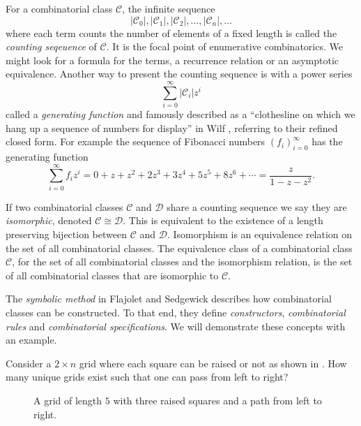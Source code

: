 For a combinatorial class $\mathcal{C}$, the infinite sequence 
\[
    |\mathcal{C}_0|, |\mathcal{C}_1|, |\mathcal{C}_2|,\dotsc,|\mathcal{C}_n|,\dotsc
\]
where each term counts the number of elements of a fixed length is called the \emph{counting seqeuence} of $\mathcal{C}$. It is the focal point of enumerative combinatorics. We might look for a formula for the terms, a recurrence relation or an asymptotic equivalence. Another way to present the counting sequence is with a power series
\[
    \sum_{i=0}^\infty |\mathcal{C}_i|z^i
\]
called a \emph{generating function} and famously described as a ``clothesline on which we hang up a sequence of numbers for display'' in Wilf \cite{wilf:gf}, referring to their refined closed form. For example the sequence of Fibonacci numbers $\left(f_i\right)_{i=0}^\infty$ has the generating function
\[
    \sum_{i=0}^\infty f_iz^i = 0 + z + z^2 + 2z^3 + 3z^4 + 5z^5 + 8z^6 + \dotsb = \frac{z}{1-z-z^2}.
\]

If two combinatorial classes $\mathcal{C}$ and $\mathcal{D}$ share a counting sequence we say they are \emph{isomorphic}, denoted $\mathcal{C} \cong \mathcal{D}$. This is equivalent to the existence of a length preserving bijection between $\mathcal{C}$ and $\mathcal{D}$. Isomorphism is an equivalence relation on the set of all combinatorial classes. The equivalence class of a combinatorial class $\mathcal{C}$, for the set of all combinatorial classes and the isomorphism relation, is the set of all combinatorial classes that are isomorphic to $\mathcal{C}$.

The \emph{symbolic method} in Flajolet and Sedgewick \cite{flajolet:ac} describes how combinatorial classes can be constructed. To that end, they define \emph{constructors}, \emph{combinatorial rules} and \emph{combinatorial specifications}. We will demonstrate these concepts with an example. 

Consider a $2 \times n$ grid where each square can be raised or not as shown in . How many unique grids exist such that one can pass from left to right?

\begin{figure}[ht!]
    \centering
    
    \caption{A grid of length $5$ with three raised squares and a path from left to right.}
    \label{fig:raised_grid}
\end{figure}

